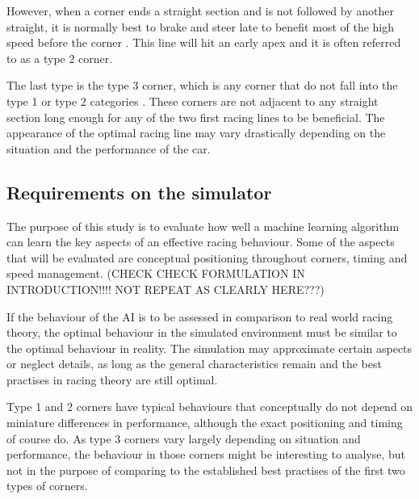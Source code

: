 However, when a corner ends a straight section and is not followed by another straight, it is normally best to brake and steer late to benefit most of the high speed before the corner \cite{edmondson}. This line will hit an early apex and it is often referred to as a type 2 corner.

The last type is the type 3 corner, which is any corner that do not fall into the type 1 or type 2 categories \cite{edmondson}. These corners are not adjacent to any straight section long enough for any of the two first racing lines to be beneficial. The appearance of the optimal racing line may vary drastically depending on the situation and the performance of the car.

\subsection{Requirements on the simulator}
\label{requirements}
The purpose of this study is to evaluate how well a machine learning algorithm can learn the key aspects of an effective racing behaviour. Some of the aspects that will be evaluated are conceptual positioning throughout corners, timing and speed management. (CHECK CHECK FORMULATION IN INTRODUCTION!!!! NOT REPEAT AS CLEARLY HERE???)

If the behaviour of the AI is to be assessed in comparison to real world racing theory, the optimal behaviour in the simulated environment must be similar to the optimal behaviour in reality. The simulation may approximate certain aspects or neglect details, as long as the general characteristics remain and the best practises in racing theory are still optimal. 


Type 1 and 2 corners have typical behaviours that conceptually do not depend on miniature differences in performance, although the exact positioning and timing of course do. As type 3 corners vary largely depending on situation and performance, the behaviour in those corners might be interesting to analyse, but not in the purpose of comparing to the established best practises of the first two types of corners.

